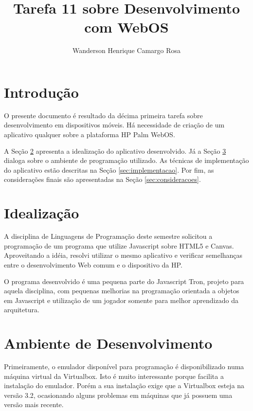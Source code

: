 \documentclass{article}
\title{Tarefa 11 sobre Desenvolvimento com WebOS}
\author{Wanderson Henrique Camargo Rosa\inst{1}}
\begin{document}
\maketitle{}

\section{Introdução}
\label{sec:introducao}

O presente documento é resultado da décima primeira tarefa sobre desenvolvimento
em dispositivos móveis. Há necessidade de criação de um aplicativo qualquer
sobre a plataforma HP Palm WebOS.

A Seção \ref{sec:idealizacao} apresenta a idealização do aplicativo
desenvolvido. Já a Seção \ref{sec:ambiente} dialoga sobre o ambiente de
programação utilizado. As técnicas de implementação do aplicativo estão
descritas na Seção \ref{sec:implementacao}. Por fim, as considerações finais são
apresentadas na Seção \ref{sec:consideracoes}.

\section{Idealização}
\label{sec:idealizacao}

A disciplina de Linguagens de Programação deste semestre solicitou a programação
de um programa que utilize Javascript sobre HTML5 e Canvas. Aproveitando a
idéia, resolvi utilizar o mesmo aplicativo e verificar semelhanças entre o
desenvolvimento Web comum e o dispositivo da HP.

O programa desenvolvido é uma pequena parte do Javascript Tron, projeto para
aquela disciplina, com pequenas melhorias na programação orientada a objetos em
Javascript e utilização de um jogador somente para melhor aprendizado da
arquitetura.

\section{Ambiente de Desenvolvimento}
\label{sec:ambiente}

Primeiramente, o emulador disponível para programação é disponibilizado numa
máquina virtual da Virtualbox. Isto é muito interessante porque facilita a
instalação do emulador. Porém a sua instalação exige que a Virtualbox esteja na
versão 3.2, ocasionando alguns problemas em máquinas que já possuem uma versão
mais recente.
\end{document}
